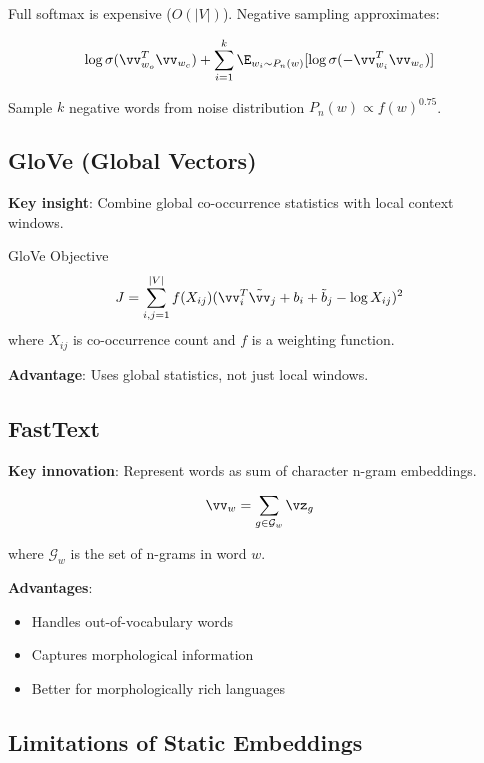 Full softmax is expensive ($O(|V|)$). Negative sampling approximates:

\begin{equation}
\log \sigma(\vv_{w_o}^T \vv_{w_c}) + \sum_{i=1}^{k} \E_{w_i \sim P_n(w)}[\log \sigma(-\vv_{w_i}^T \vv_{w_c})]
\end{equation}

Sample $k$ negative words from noise distribution $P_n(w) \propto f(w)^{0.75}$.

\subsection{GloVe (Global Vectors)}

\textbf{Key insight}: Combine global co-occurrence statistics with local context windows.

\begin{mathresult}{GloVe Objective}
\begin{equation}
J = \sum_{i,j=1}^{|V|} f(X_{ij}) (\vv_i^T \tilde{\vv}_j + b_i + \tilde{b}_j - \log X_{ij})^2
\end{equation}
where $X_{ij}$ is co-occurrence count and $f$ is a weighting function.
\end{mathresult}

\textbf{Advantage}: Uses global statistics, not just local windows.

\subsection{FastText}

\textbf{Key innovation}: Represent words as sum of character n-gram embeddings.

\begin{equation}
\vv_w = \sum_{g \in \mathcal{G}_w} \vz_g
\end{equation}

where $\mathcal{G}_w$ is the set of n-grams in word $w$.

\textbf{Advantages}:
\begin{itemize}
    \item Handles out-of-vocabulary words
    \item Captures morphological information
    \item Better for morphologically rich languages
\end{itemize}

\subsection{Limitations of Static Embeddings}


